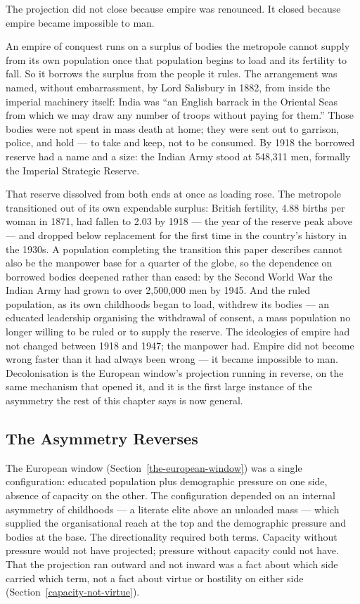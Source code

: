\documentclass[12pt,letterpaper]{article}
\begin{document}
The projection did not close because empire was renounced. It closed
because empire became impossible to man.

An empire of conquest runs on a surplus of bodies the metropole cannot
supply from its own population once that population begins to load and
its fertility to fall. So it borrows the surplus from the people it
rules. The arrangement was named, without embarrassment, by Lord Salisbury in
1882, from inside the imperial machinery itself: India was ``an English
barrack in the Oriental Seas from which we may draw any number of troops
without paying for them.'' Those bodies were not spent in mass death
at home; they were sent out to garrison, police, and hold --- to take
and keep, not to be consumed. By 1918 the borrowed reserve had a name
and a size: the Indian Army stood at 548,311 men, formally the Imperial
Strategic Reserve.

That reserve dissolved from both ends at once as loading rose. The
metropole transitioned out of its own expendable surplus: British
fertility, 4.88 births per woman in 1871, had fallen to 2.03 by 1918 ---
the year of the reserve peak above --- and dropped below replacement for
the first time in the country's history in the 1930s. A population
completing the transition this paper describes cannot also be the
manpower base for a quarter of the globe, so the dependence on borrowed
bodies deepened rather than eased: by the Second World War the Indian
Army had grown to over 2{,}500{,}000 men by 1945. And the ruled
population, as its own childhoods began to load, withdrew its bodies ---
an educated leadership organising the withdrawal of consent, a mass
population no longer willing to be ruled or to supply the reserve. The
ideologies of empire had not changed between 1918 and 1947; the manpower
had. Empire did not become wrong faster than it had always been wrong
--- it became impossible to man. Decolonisation is the European window's
projection running in reverse, on the same mechanism that opened it, and
it is the first large instance of the asymmetry the rest of this chapter
says is now general.

\subsection{The Asymmetry Reverses}\label{the-asymmetry-reverses}

The European window (Section~\ref{the-european-window}) was a single
configuration: educated population plus demographic pressure on one
side, absence of capacity on the other. The configuration depended
on an internal asymmetry of childhoods --- a literate elite above an
unloaded mass --- which supplied the organisational reach at the top
and the demographic pressure and bodies at the base. The
directionality required both terms. Capacity without pressure would
not have projected; pressure without capacity could not have. That
the projection ran outward and not inward was a fact about which side
carried which term, not a fact about virtue or hostility on either
side (Section~\ref{capacity-not-virtue}).
\end{document}
